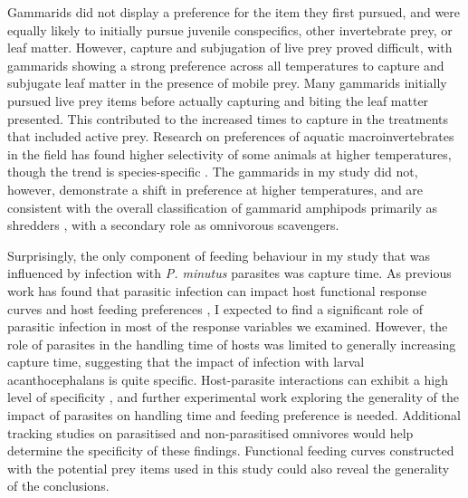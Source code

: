 Gammarids did not display a preference for the item they first pursued, and were equally likely to initially pursue juvenile conspecifics, other invertebrate prey, or leaf matter. However, capture and subjugation of live prey proved difficult, with gammarids showing a strong preference across all temperatures to capture and subjugate leaf matter in the presence of mobile prey. Many gammarids initially pursued live prey items before actually capturing and biting the leaf matter presented. This contributed to the increased times to capture in the treatments that included active prey. Research on preferences of aquatic macroinvertebrates in the field has found higher selectivity of some animals at higher temperatures, though the trend is species-specific \citep{boersma2016, ogorman2016}. The gammarids in my study did not, however, demonstrate a shift in preference at higher temperatures, and are consistent with the overall classification of gammarid amphipods primarily as shredders \citep{cummins1979, macneil1997}, with a secondary role as omnivorous scavengers.   

Surprisingly, the only component of feeding behaviour in my study that was influenced by infection with \emph{P. minutus} parasites was capture time. As previous work has found that parasitic infection can impact host functional response curves \citep{toscano2014} and host feeding preferences \citep{bunke2015}, I expected to find a significant role of parasitic infection in most of the response variables we examined. However, the role of parasites in the handling time of hosts was limited to generally increasing capture time, suggesting that the impact of infection with larval acanthocephalans is quite specific. Host-parasite interactions can exhibit a high level of specificity \citep{hynes1958, zittel2018}, and further experimental work exploring the generality of the impact of parasites on handling time and feeding preference is needed. Additional tracking studies on parasitised and non-parasitised omnivores would help determine the specificity of these findings. Functional feeding curves constructed with the potential prey items used in this study could also reveal the generality of the conclusions. 

